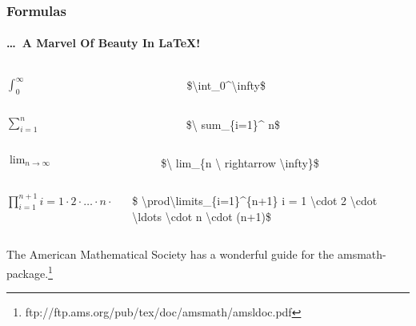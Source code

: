 \begin{frame}
\frametitle{Formulas}
\framesubtitle{\ldots ~A Marvel Of Beauty In \LaTeX !}
\begin{columns}
	\begin{column}{.4\textwidth}
		\flushright
		$\int_0^\infty$
	\end{column}
	\begin{column}{.6\textwidth}
		\flushleft
		{\ttfamily\color{unibayellowI}\$\color{nounibaredI}\textbackslash\color{nounibaredI}int\_\color{black}0\color{nounibaredI}\textasciicircum \textbackslash infty\color{unibayellowI}\$}
	\end{column}
\end{columns}
\begin{columns}
	\begin{column}{.4\textwidth}
		\flushright
		$\sum_{i=1}^n$
	\end{column}
	\begin{column}{.6\textwidth}
		\flushleft
		{\ttfamily \color{unibayellowI}\$\color{nounibaredI}\textbackslash
			\color{nounibaredI}sum\_\color{black}\{i=1\}\color{nounibaredI}\textasciicircum
			\color{black}n\color{unibayellowI}\$}
	\end{column}
\end{columns}

\begin{columns}
	\begin{column}{.4\textwidth}
		\flushright
		$\lim_{n \rightarrow \infty}$
	\end{column}
	\begin{column}{.6\textwidth}
		\flushleft
		{\ttfamily \color{unibayellowI}\$\color{nounibaredI}\textbackslash
			\color{nounibaredI}lim\_\color{black}\{n \color{nounibaredI}\textbackslash
			\color{nounibaredI}rightarrow \color{nounibaredI}\textbackslash infty\color{black}\}\color{unibayellowI}\$}
	\end{column}
\end{columns}

\begin{columns}
	\begin{column}{.4\textwidth}
		\flushright
		$\prod\limits_{i=1}^{n+1}i = 1 \cdot 2 \cdot \ldots \cdot n \cdot (n+1)$
	\end{column}
	\begin{column}{.6\textwidth}
		\flushleft
		{\ttfamily \color{unibayellowI}\$%
			\color{nounibaredI}\textbackslash\color{nounibaredI}prod\textbackslash  limits\_\color{black}\{i=1\}\color{nounibaredI}\^{}\color{black}\{n+1\} i = 1 \color{nounibaredI}\textbackslash \color{nounibaredI}cdot \color{black}2 \color{nounibaredI}\textbackslash \color{nounibaredI}cdot \color{nounibaredI}\textbackslash \color{nounibaredI}ldots \color{nounibaredI}\textbackslash\color{nounibaredI}cdot \color{black}n \color{nounibaredI}\textbackslash \color{nounibaredI}cdot \color{black}(n+1)\color{unibayellowI}\$}
	\end{column}
\end{columns}
\bigskip
The American Mathematical Society has a wonderful guide for the {\ttfamily amsmath}-package.\footnote{ftp://ftp.ams.org/pub/tex/doc/amsmath/amsldoc.pdf}
\end{frame}